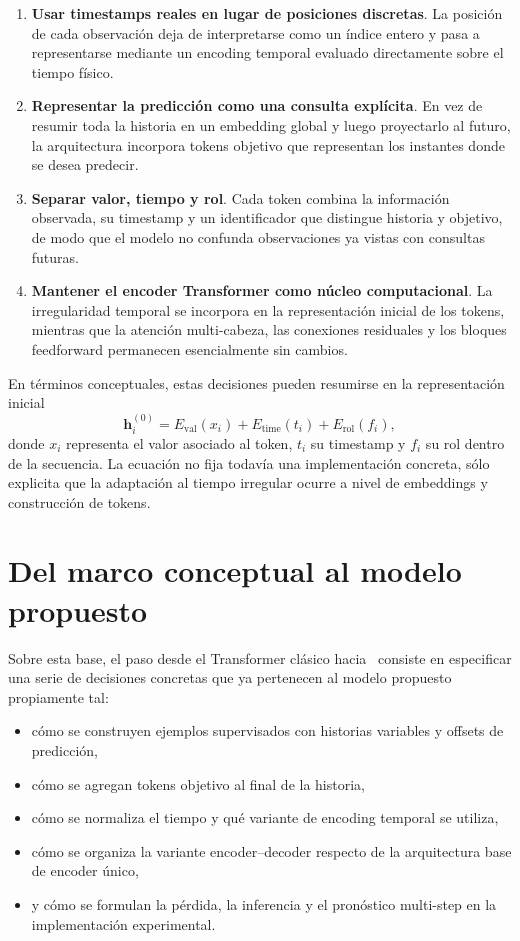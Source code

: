 \begin{enumerate}
    \item \textbf{Usar timestamps reales en lugar de posiciones discretas}. La posición de cada observación deja de interpretarse como un índice entero y pasa a representarse mediante un encoding temporal evaluado directamente sobre el tiempo físico.
    \item \textbf{Representar la predicción como una consulta explícita}. En vez de resumir toda la historia en un embedding global y luego proyectarlo al futuro, la arquitectura incorpora tokens objetivo que representan los instantes donde se desea predecir.
    \item \textbf{Separar valor, tiempo y rol}. Cada token combina la información observada, su timestamp y un identificador que distingue historia y objetivo, de modo que el modelo no confunda observaciones ya vistas con consultas futuras.
    \item \textbf{Mantener el encoder Transformer como núcleo computacional}. La irregularidad temporal se incorpora en la representación inicial de los tokens, mientras que la atención multi-cabeza, las conexiones residuales y los bloques feedforward permanecen esencialmente sin cambios.
\end{enumerate}

En términos conceptuales, estas decisiones pueden resumirse en la representación inicial
\begin{equation}
    \mathbf{h}_i^{(0)}
    =
    E_{\text{val}}(x_i)
    +
    E_{\text{time}}(t_i)
    +
    E_{\text{rol}}(f_i),
\end{equation}
donde $x_i$ representa el valor asociado al token, $t_i$ su timestamp y $f_i$ su rol dentro de la secuencia. La ecuación no fija todavía una implementación concreta, sólo explicita que la adaptación al tiempo irregular ocurre a nivel de embeddings y construcción de tokens.

\section{Del marco conceptual al modelo propuesto}
\label{sec:token-target}

Sobre esta base, el paso desde el Transformer clásico hacia \CTTransformer\ consiste en especificar una serie de decisiones concretas que ya pertenecen al modelo propuesto propiamente tal:

\begin{itemize}
    \item cómo se construyen ejemplos supervisados con historias variables y offsets de predicción,
    \item cómo se agregan tokens objetivo al final de la historia,
    \item cómo se normaliza el tiempo y qué variante de encoding temporal se utiliza,
    \item cómo se organiza la variante encoder--decoder respecto de la arquitectura base de encoder único,
    \item y cómo se formulan la pérdida, la inferencia y el pronóstico multi-step en la implementación experimental.
\end{itemize}

